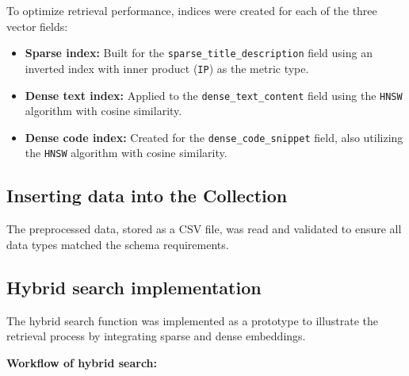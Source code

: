 To optimize retrieval performance, indices were created for each of the three vector fields:
\begin{itemize}
	\item \textbf{Sparse index:} Built for the \texttt{sparse\_title\_description} field using an inverted index with inner product (\texttt{IP}) as the metric type.
	\item \textbf{Dense text index:} Applied to the \texttt{dense\_text\_content} field using the \texttt{HNSW} algorithm with cosine similarity.
	\item \textbf{Dense code index:} Created for the \texttt{dense\_code\_snippet} field, also utilizing the \texttt{HNSW} algorithm with cosine similarity.
\end{itemize}

\subsection{Inserting data into the Collection}

The preprocessed data, stored as a CSV file, was read and validated to ensure all data types matched the schema requirements.

\subsection{Hybrid search implementation}

The hybrid search function was implemented as a prototype to illustrate the retrieval process by integrating sparse and dense embeddings.

\textbf{Workflow of hybrid search:}

